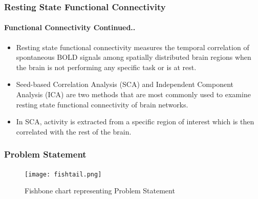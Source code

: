 \documentclass{beamer}
\begin{document}
  \begin{frame}[t]
    \frametitle{Resting State Functional Connectivity}
    \framesubtitle{Functional Connectivity Continued..}

    \vskip 20pt


    \begin{itemize}

      \item Resting state functional connectivity measures the
        temporal correlation of spontaneous BOLD signals among
        spatially distributed brain regions when the brain is not
        performing any specific task or is at rest. \vskip 10pt


      \item Seed-based Correlation Analysis (SCA) and Independent
        Component Analysis (ICA) are two methods that are most
        commonly used to examine resting state functional connectivity
        of brain networks. \vskip 10pt

      \item In SCA, activity is extracted from a specific region of
        interest which is then correlated with the rest of the brain.

    \end{itemize}

  \end{frame}

  \begin{frame}[t]
    \frametitle{Problem Statement}

    \begin{figure}[H]
      \centering
      \vskip 20pt
      \hskip -60pt
      \texttt{[image: fishtail.png]}
      \caption{Fishbone chart representing Problem Statement}
    \end{figure}

  \end{frame}
\end{document}
